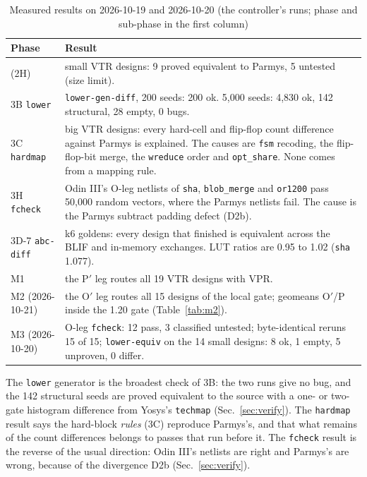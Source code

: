 \documentclass[conference]{IEEEtran}
\newcommand{\code}[1]{\texttt{#1}}
\begin{document}
\begin{table}[!tp]
\caption{Measured results on 2026-10-19 and 2026-10-20 (the controller's runs; phase and sub-phase in the first column)}
\label{tab:measured}
\centering
\footnotesize
\begin{tabular}{@{}>{\raggedright\arraybackslash}p{}%
  >{\raggedright\arraybackslash}p{}@{}}
\toprule
Phase & Result \\
\midrule
2 (2H) & 14 small VTR designs: 9 proved equivalent to Parmys, 5 untested (size limit). \\
3B \code{lower} & \code{lower-gen-diff}, 200 seeds: 200 ok. 5,000 seeds: 4,830 ok, 142 structural,
  28 empty, 0 bugs. \\
3C \code{hardmap} & 12 big VTR designs: every hard-cell and flip-flop count difference against
  Parmys is explained. The causes are \code{fsm} recoding, the flip-flop-bit merge, the
  \code{wreduce} order and \code{opt\_share}. None comes from a mapping rule. \\
3H \code{fcheck} & Odin III's O-leg netlists of \code{sha}, \code{blob\_merge} and \code{or1200}
  pass 50,000 random vectors, where the Parmys netlists fail. The cause is the Parmys subtract
  padding defect (D2b). \\
3D-7 \code{abc-diff} & 29 k6 goldens: every design that finished is equivalent across the BLIF
  and in-memory exchanges. LUT ratios are 0.95 to 1.02 (\code{sha} 1.077). \\
M1 & the P$'$ leg routes all 19 VTR designs with VPR. \\
M2 (2026-10-21) & the O$'$ leg routes all 15 designs of the local gate; geomeans O$'$/P inside the
  1.20 gate (Table~\ref{tab:m2}). \\
M3 (2026-10-20) & O-leg \code{fcheck}: 12 pass, 3 classified untested; byte-identical reruns 15 of
  15; \code{lower-equiv} on the 14 small designs: 8 ok, 1 empty, 5 unproven, 0 differ. \\
\bottomrule
\end{tabular}
\end{table}

The \code{lower} generator is the broadest check of 3B: the two runs give no bug, and the 142
structural seeds are proved equivalent to the source with a one- or two-gate histogram difference
from Yosys's \code{techmap} (Sec.~\ref{sec:verify}). The \code{hardmap} result says the hard-block
\emph{rules} (3C) reproduce Parmys's, and that what remains of the count differences belongs to
passes that run before it. The \code{fcheck} result is the reverse of the usual direction: Odin
III's netlists are right and Parmys's are wrong, because of the divergence D2b (Sec.~\ref{sec:verify}).
\end{document}
